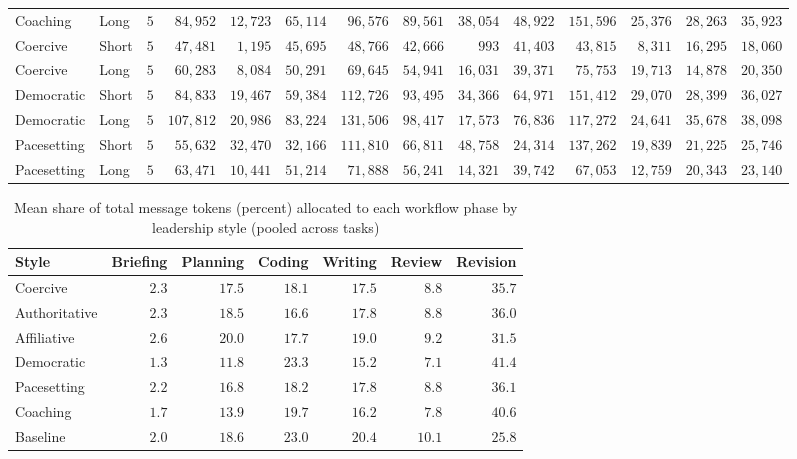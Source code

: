 \begin{table}[htbp]
{\begin{tabular}{llrrrrrrrrrrrr}
    Coaching & Long & $5$ & $84,952$ & $12,723$ & $65,114$ & $96,576$ & $89,561$ & $38,054$ & $48,922$ & $151,596$ & $25,376$ & $28,263$ & $35,923$ \\
    Coercive & Short & $5$ & $47,481$ & $1,195$ & $45,695$ & $48,766$ & $42,666$ & $993$ & $41,403$ & $43,815$ & $8,311$ & $16,295$ & $18,060$ \\
    Coercive & Long & $5$ & $60,283$ & $8,084$ & $50,291$ & $69,645$ & $54,941$ & $16,031$ & $39,371$ & $75,753$ & $19,713$ & $14,878$ & $20,350$ \\
    Democratic & Short & $5$ & $84,833$ & $19,467$ & $59,384$ & $112,726$ & $93,495$ & $34,366$ & $64,971$ & $151,412$ & $29,070$ & $28,399$ & $36,027$ \\
    Democratic & Long & $5$ & $107,812$ & $20,986$ & $83,224$ & $131,506$ & $98,417$ & $17,573$ & $76,836$ & $117,272$ & $24,641$ & $35,678$ & $38,098$ \\
    Pacesetting & Short & $5$ & $55,632$ & $32,470$ & $32,166$ & $111,810$ & $66,811$ & $48,758$ & $24,314$ & $137,262$ & $19,839$ & $21,225$ & $25,746$ \\
    Pacesetting & Long & $5$ & $63,471$ & $10,441$ & $51,214$ & $71,888$ & $56,241$ & $14,321$ & $39,742$ & $67,053$ & $12,759$ & $20,343$ & $23,140$ \\
    \bottomrule
\end{tabular}%
}
\end{table}

\begin{table}[htbp]
  \centering
  \small
  \setlength{\tabcolsep}{2pt}
  \caption{Mean share of total message tokens (percent) allocated to each workflow phase by leadership style (pooled across tasks)}
  \label{tab:03-phase-token-share}
\begin{tabular}{lrrrrrr}
    \toprule
    Style & Briefing & Planning & Coding & Writing & Review & Revision \\
    \midrule
    Coercive & $2.3$ & $17.5$ & $18.1$ & $17.5$ & $8.8$ & $35.7$ \\
    Authoritative & $2.3$ & $18.5$ & $16.6$ & $17.8$ & $8.8$ & $36.0$ \\
    Affiliative & $2.6$ & $20.0$ & $17.7$ & $19.0$ & $9.2$ & $31.5$ \\
    Democratic & $1.3$ & $11.8$ & $23.3$ & $15.2$ & $7.1$ & $41.4$ \\
    Pacesetting & $2.2$ & $16.8$ & $18.2$ & $17.8$ & $8.8$ & $36.1$ \\
    Coaching & $1.7$ & $13.9$ & $19.7$ & $16.2$ & $7.8$ & $40.6$ \\
    Baseline & $2.0$ & $18.6$ & $23.0$ & $20.4$ & $10.1$ & $25.8$ \\
    \bottomrule
\end{tabular}%
\end{table}

